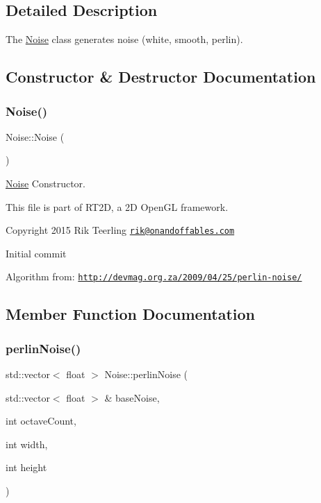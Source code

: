 \subsection{Detailed Description}
The \hyperlink{class_noise}{Noise} class generates noise (white, smooth, perlin). 

\subsection{Constructor \& Destructor Documentation}
\mbox{\label{class_noise_a875a47574d1c86c793296b542e7de9f3}} 
\subsubsection{\texorpdfstring{Noise()}{Noise()}}
{\footnotesize\ttfamily Noise\+::\+Noise (\begin{DoxyParamCaption}{ }\end{DoxyParamCaption})}



\hyperlink{class_noise}{Noise} Constructor. 

This file is part of R\+T2D, a 2D Open\+GL framework.


\begin{DoxyItemize}
\item Copyright 2015 Rik Teerling \href{mailto:rik@onandoffables.com}{\tt rik@onandoffables.\+com}
\begin{DoxyItemize}
\item Initial commit
\end{DoxyItemize}
\end{DoxyItemize}

Algorithm from\+: \href{http://devmag.org.za/2009/04/25/perlin-noise/}{\tt http\+://devmag.\+org.\+za/2009/04/25/perlin-\/noise/} 

\subsection{Member Function Documentation}
\mbox{\label{class_noise_aa889cc8a2f25fbf1a98a1eaeef7288cb}} 
\subsubsection{\texorpdfstring{perlin\+Noise()}{perlinNoise()}}
{\footnotesize\ttfamily std\+::vector$<$ float $>$ Noise\+::perlin\+Noise (\begin{DoxyParamCaption}\item[{std\+::vector$<$ float $>$ \&}]{base\+Noise,  }\item[{int}]{octave\+Count,  }\item[{int}]{width,  }\item[{int}]{height }\end{DoxyParamCaption})\hspace{0.3cm}{\ttfamily [static]}}



